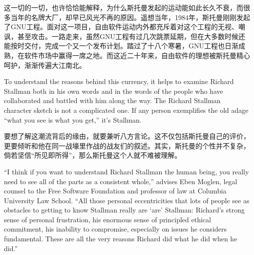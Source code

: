 \ifdefined\chs
这一切的一切，也许恰恰能解释，为什么斯托曼发起的运动能如此长久不衰，而很多当年的名牌大厂，却早已风光不再的原因。遥想当年，1984年，斯托曼刚刚发起了GNU工程。面对这一项目，自由软件运动内外都充斥着对这个工程的无视、嘲讽，甚至攻击。一路走来，虽然GNU工程有过几次跳票延期，但在大多数时候还能按时交付，完成一个又一个发布计划。踏过了十八个寒暑，GNU工程也日渐成熟，在软件市场中赢得一席之地。而这近二十年来，自由软件的理想被斯托曼精心呵护，渐渐传遍大江南北。
\fi

\ifdefined\eng
To understand the reasons behind this currency, it helps to examine Richard Stallman both in his own words and in the words of the people who have collaborated and battled with him along the way. The Richard Stallman character sketch is not a complicated one. If any person exemplifies the old adage ``what you see is what you get,'' it's Stallman.
\fi

\ifdefined\chs
要想了解这潮流背后的缘由，就要兼听八方言论。这不仅包括斯托曼自己的评价，更要倾听和他在同一战壕里作战的战友们的叙述。其实，斯托曼的个性并不复杂，倘若坚信``所见即所得''，那么斯托曼这个人就不难被理解。
\fi

\ifdefined\eng
``I think if you want to understand Richard Stallman the human being, you really need to see all of the parts as a consistent whole,'' advises Eben Moglen, legal counsel to the Free Software Foundation and professor of law at Columbia University Law School. ``All those personal eccentricities that lots of people see as obstacles to getting to know Stallman really \ifdefined\vone are \fi\ifdefined\vtwo `are' \fi Stallman: Richard's strong sense of personal frustration, his enormous sense of principled ethical commitment, his inability to compromise, especially on issues he considers fundamental. These are all the very reasons Richard did what he did when he did.''
\fi

